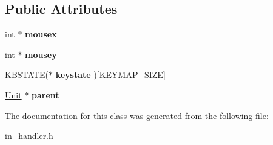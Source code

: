 \subsection*{Public Attributes}
\begin{DoxyCompactItemize}
\item 
int $\ast$ {\bfseries mousex}\hypertarget{classInputListener_a60afc97e405ce7e03062b9ca2d6489e0}{}\label{classInputListener_a60afc97e405ce7e03062b9ca2d6489e0}

\item 
int $\ast$ {\bfseries mousey}\hypertarget{classInputListener_af5cc78f0e74fdc02190a90fc50bc1513}{}\label{classInputListener_af5cc78f0e74fdc02190a90fc50bc1513}

\item 
K\+B\+S\+T\+A\+TE($\ast$ {\bfseries keystate} )\mbox{[}K\+E\+Y\+M\+A\+P\+\_\+\+S\+I\+ZE\mbox{]}\hypertarget{classInputListener_ad1bc3712bf6dfb5be5432a5e1124c4df}{}\label{classInputListener_ad1bc3712bf6dfb5be5432a5e1124c4df}

\item 
\hyperlink{classUnit}{Unit} $\ast$ {\bfseries parent}\hypertarget{classInputListener_a9f78b71316f57edc3f9fab108d607f9f}{}\label{classInputListener_a9f78b71316f57edc3f9fab108d607f9f}

\end{DoxyCompactItemize}


The documentation for this class was generated from the following file\+:\begin{DoxyCompactItemize}
\item 
in\+\_\+handler.\+h\end{DoxyCompactItemize}

